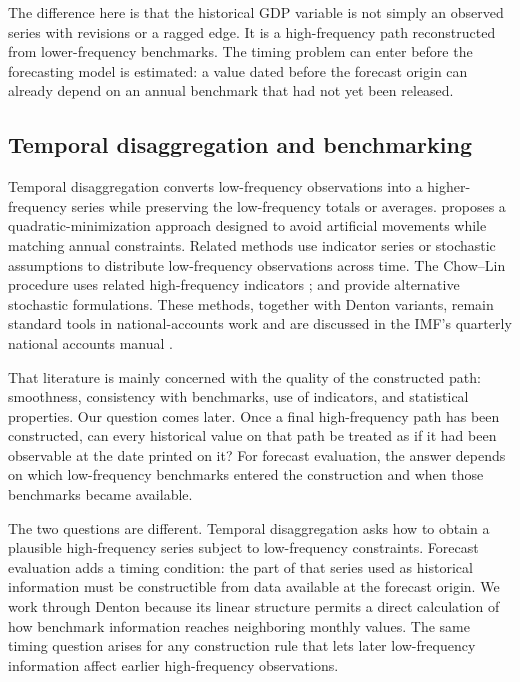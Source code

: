 \documentclass[preprint,12pt,authoryear]{elsarticle}
\begin{document}
The difference here is that the historical GDP variable is not simply an observed series with revisions or a ragged edge. It is a high-frequency path reconstructed from lower-frequency benchmarks. The timing problem can enter before the forecasting model is estimated: a value dated before the forecast origin can already depend on an annual benchmark that had not yet been released.

\subsection{Temporal disaggregation and benchmarking}

Temporal disaggregation converts low-frequency observations into a higher-frequency series while preserving the low-frequency totals or averages. \citet{denton1971} proposes a quadratic-minimization approach designed to avoid artificial movements while matching annual constraints. Related methods use indicator series or stochastic assumptions to distribute low-frequency observations across time. The Chow--Lin procedure uses related high-frequency indicators \citep{chowlin1971}; \citet{fernandez1981} and \citet{litterman1983} provide alternative stochastic formulations. These methods, together with Denton variants, remain standard tools in national-accounts work and are discussed in the IMF's quarterly national accounts manual \citep{imfqna2017}.

That literature is mainly concerned with the quality of the constructed path: smoothness, consistency with benchmarks, use of indicators, and statistical properties. Our question comes later. Once a final high-frequency path has been constructed, can every historical value on that path be treated as if it had been observable at the date printed on it? For forecast evaluation, the answer depends on which low-frequency benchmarks entered the construction and when those benchmarks became available.

The two questions are different. Temporal disaggregation asks how to obtain a plausible high-frequency series subject to low-frequency constraints. Forecast evaluation adds a timing condition: the part of that series used as historical information must be constructible from data available at the forecast origin. We work through Denton because its linear structure permits a direct calculation of how benchmark information reaches neighboring monthly values. The same timing question arises for any construction rule that lets later low-frequency information affect earlier high-frequency observations.
\end{document}
